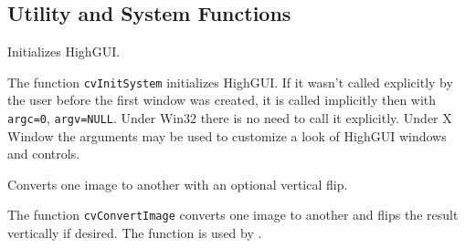 \ifC
\subsection{Utility and System Functions}


Initializes HighGUI.


\begin{description}
\end{description}

The function \texttt{cvInitSystem} initializes HighGUI. If it wasn't
called explicitly by the user before the first window was created, it is
called implicitly then with \texttt{argc=0}, \texttt{argv=NULL}. Under
Win32 there is no need to call it explicitly. Under X Window the arguments
may be used to customize a look of HighGUI windows and controls.


Converts one image to another with an optional vertical flip.


\begin{description}
\end{description}

The function \texttt{cvConvertImage} converts one image to another and flips the result vertically if desired. The function is used by .
\fi
